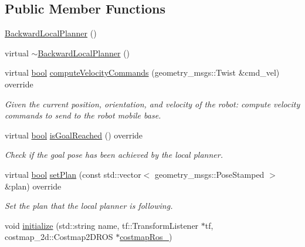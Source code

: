 \subsection*{Public Member Functions}
\begin{DoxyCompactItemize}
\item 
\hyperlink{classmove__base__z__client_1_1backward__local__planner_1_1BackwardLocalPlanner_a9de6ad61e5c2ec81c6e4842778268457}{Backward\+Local\+Planner} ()
\item 
virtual \hyperlink{classmove__base__z__client_1_1backward__local__planner_1_1BackwardLocalPlanner_a8d57b252d272da3c42920ee3687ddcc6}{$\sim$\+Backward\+Local\+Planner} ()
\item 
virtual \hyperlink{classbool}{bool} \hyperlink{classmove__base__z__client_1_1backward__local__planner_1_1BackwardLocalPlanner_a8e7dec0bc31856d814d8fa6df747bbb8}{compute\+Velocity\+Commands} (geometry\+\_\+msgs\+::\+Twist \&cmd\+\_\+vel) override
\begin{DoxyCompactList}\small\item\em Given the current position, orientation, and velocity of the robot\+: compute velocity commands to send to the robot mobile base. \end{DoxyCompactList}\item 
virtual \hyperlink{classbool}{bool} \hyperlink{classmove__base__z__client_1_1backward__local__planner_1_1BackwardLocalPlanner_a625198f20113c62e95ffaa82ecc3f472}{is\+Goal\+Reached} () override
\begin{DoxyCompactList}\small\item\em Check if the goal pose has been achieved by the local planner. \end{DoxyCompactList}\item 
virtual \hyperlink{classbool}{bool} \hyperlink{classmove__base__z__client_1_1backward__local__planner_1_1BackwardLocalPlanner_a3b552c90996d21cadf7b2f0875706407}{set\+Plan} (const std\+::vector$<$ geometry\+\_\+msgs\+::\+Pose\+Stamped $>$ \&plan) override
\begin{DoxyCompactList}\small\item\em Set the plan that the local planner is following. \end{DoxyCompactList}\item 
void \hyperlink{classmove__base__z__client_1_1backward__local__planner_1_1BackwardLocalPlanner_ac2cd25cd0be3bfc945826af5e9f0d5d0}{initialize} (std\+::string name, tf\+::\+Transform\+Listener $\ast$tf, costmap\+\_\+2d\+::\+Costmap2\+D\+R\+OS $\ast$\hyperlink{classmove__base__z__client_1_1backward__local__planner_1_1BackwardLocalPlanner_a865618f84238fe6ff437d1e38ec5fec0}{costmap\+Ros\+\_\+})

\end{DoxyCompactItemize}
